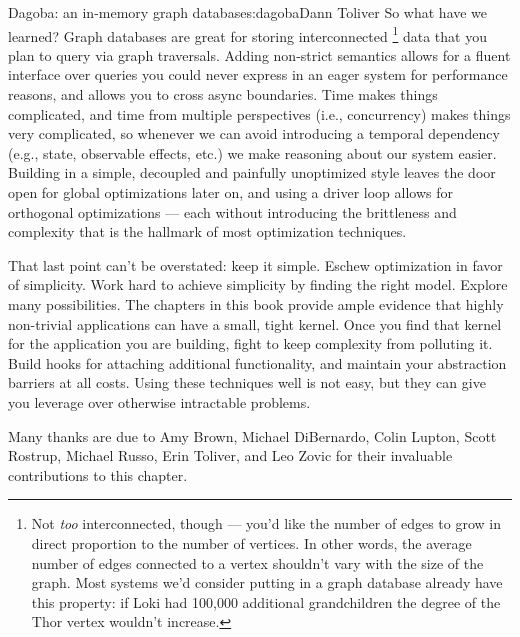 \begin{aosachapter}{Dagoba: an in-memory graph database}{s:dagoba}{Dann Toliver}
So what have we learned? Graph databases are great for storing
interconnected \footnote{Not \emph{too} interconnected, though --- you'd
  like the number of edges to grow in direct proportion to the number of
  vertices. In other words, the average number of edges connected to a
  vertex shouldn't vary with the size of the graph. Most systems we'd
  consider putting in a graph database already have this property: if
  Loki had 100,000 additional grandchildren the degree of the Thor
  vertex wouldn't increase.} data that you plan to query via graph
traversals. Adding non-strict semantics allows for a fluent interface
over queries you could never express in an eager system for performance
reasons, and allows you to cross async boundaries. Time makes things
complicated, and time from multiple perspectives (i.e., concurrency)
makes things very complicated, so whenever we can avoid introducing a
temporal dependency (e.g., state, observable effects, etc.) we make
reasoning about our system easier. Building in a simple, decoupled and
painfully unoptimized style leaves the door open for global
optimizations later on, and using a driver loop allows for orthogonal
optimizations --- each without introducing the brittleness and
complexity that is the hallmark of most optimization techniques.

That last point can't be overstated: keep it simple. Eschew optimization
in favor of simplicity. Work hard to achieve simplicity by finding the
right model. Explore many possibilities. The chapters in this book
provide ample evidence that highly non-trivial applications can have a
small, tight kernel. Once you find that kernel for the application you
are building, fight to keep complexity from polluting it. Build hooks
for attaching additional functionality, and maintain your abstraction
barriers at all costs. Using these techniques well is not easy, but they
can give you leverage over otherwise intractable problems.

\label{acknowledgements}

Many thanks are due to Amy Brown, Michael DiBernardo, Colin Lupton,
Scott Rostrup, Michael Russo, Erin Toliver, and Leo Zovic for their
invaluable contributions to this chapter.

\end{aosachapter}

